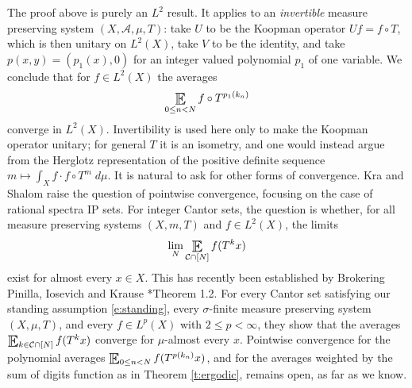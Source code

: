 The proof above is purely an $L^2$ result. 
It applies to an \emph{invertible} measure preserving system $(X,\mathcal A,\mu ,T)$: take $U$ to be the Koopman operator $Uf=f\circ T$, which is then unitary on $L^2(X)$, 
take $V$ to be the identity, and take $p(x,y)=(p_1(x),0)$ for an integer valued polynomial $p_1$ of one variable. 
We conclude that for $f\in L^2(X)$ the averages 
\begin{equation}
 \Expectation _{0\leq n<N} f\circ T^{p_1(k_n)} 
\end{equation}
converge in $L^2(X)$. 
Invertibility is used here only to make the Koopman operator unitary; for general $T$ it is an isometry, and one would instead argue from the Herglotz representation of the positive definite sequence $m\mapsto \int_X f\cdot f\circ T^{m}\;d\mu$.
It is natural to ask for other forms of convergence. 
Kra and Shalom \cite{kra2025ergodicaverageslargeintersection} raise the question of pointwise convergence, focusing on the case of rational spectra IP sets. 
For integer Cantor sets, the question is whether, for all measure preserving systems $(X,m,T)$ and $f\in L^2(X)$, the limits 
\begin{equation}
    \lim_N \Expectation_{\mathcal C \cap [N]}  f(T^{k} x)
\end{equation}
exist for almost every $x\in X$. 
This has recently been established by Brokering Pinilla, Iosevich and Krause \cite{pinilla2026pointwiseconvergenceergodicaverages}*{Theorem 1.2}. 
For every Cantor set satisfying our standing assumption \eqref{e:standing}, every $\sigma$-finite measure preserving system $(X,\mu,T)$, and every $f\in L^p(X)$ with $2\leq p<\infty$, 
they show that the averages $\Expectation_{k\in\mathcal C\cap[N]}f(T^kx)$ converge for $\mu$-almost every $x$. 
Pointwise convergence for the polynomial averages $\Expectation_{0\leq n<N}f(T^{p(k_n)}x)$, and for the averages weighted by the sum of digits function as in Theorem \ref{t:ergodic}, remains open, as far as we know.
 

